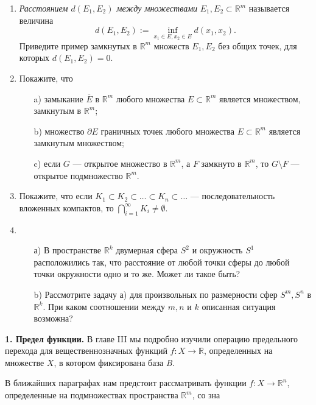 \documentclass[a4paper, 12pt]{book}
\begin{document}
    {\setlength{\parskip}{0pt}\begin{enumerate}
        \item \textit{Расстоянием $d(E_1, E_2)$ между множествами} $E_1, E_2 \subset \mathbb{R}^m$ называется величина \[d(E_1, E_2) := \inf_{x_1 \in E, x_2 \in E} d(x_1, x_2).\] Приведите пример замкнутых в $\mathbb{R}^m$ множеств $E_1, E_2$ без общих точек, для которых $d(E_1, E_2) = 0$.
        \item Покажите, что
        \begin{itemize}
            \item [a)] замыкание $\overline{E}$ в $\mathbb{R}^m$ любого множества $E \subset \mathbb{R}^m$ является множеством, замкнутым в $\mathbb{R}^m$;
            \item [b)] множество $\partial E$ граничных точек любого множества $E \subset \mathbb{R}^m$ является замкнутым множеством;
            \item [c)] если $G$ — открытое множество в $\mathbb{R}^m$, а $F$ замкнуто в $\mathbb{R}^m$, то $G \setminus F$ — открытое подмножество $\mathbb{R}^m$.
        \end{itemize}
        \item Покажите, что если $K_1 \subset K_2 \subset \dots \subset K_n \subset \dots$ — последовательность вложенных компактов, то $\bigcap\limits_{i=1}^{\infty}K_i \neq \emptyset$.
        \item 
        \begin{itemize}
            \item [а)] В пространстве $\mathbb{R}^k$ двумерная сфера $S^2$ и окружность $S^1$ расположились так, что расстояние от любой точки сферы до любой точки окружности одно и то же. Может ли такое быть?
            \item [b)] Рассмотрите задачу а) для произвольных по размерности сфер $S^m, S^n$ в $\mathbb{R}^k$. При каком соотношении между $m, n$ и $k$ описанная ситуация возможна?
        \end{itemize}
    \end{enumerate}}
        
    {}
    \par\textbf{1. Предел функции.} В главе III мы подробно изучили операцию предельного перехода для вещественнозначных функций $f : X \rightarrow \mathbb{R}$, определенных на множестве $X$, в котором фиксирована база \textit{B}.
    {\setlength{\parskip}{0pt}
    \par В ближайших параграфах нам предстоит рассматривать функции $f : X \rightarrow \mathbb{R}^n$, определенные на подмножествах пространства $\mathbb{R}^m$, со зна}
    
\end{document}
